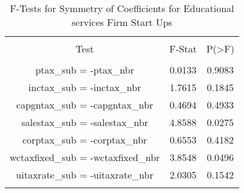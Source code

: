 
\begin{table}[!htbp] \centering 
  \caption{F-Tests for Symmetry of Coefficients for Educational services Firm Start Ups} 
  \label{61Ftests} 
\begin{tabular}{@{\extracolsep{5pt}} ccc} 
\\[-1.8ex]\hline 
\hline \\[-1.8ex] 
Test & F-Stat & P(\textgreater F) \\ 
\hline \\[-1.8ex] 
ptax\_sub = -ptax\_nbr & 0.0133 & 0.9083 \\ 
inctax\_sub = -inctax\_nbr & 1.7615 & 0.1845 \\ 
capgntax\_sub = -capgntax\_nbr & 0.4694 & 0.4933 \\ 
salestax\_sub = -salestax\_nbr & 4.8588 & 0.0275 \\ 
corptax\_sub = -corptax\_nbr & 0.6553 & 0.4182 \\ 
wctaxfixed\_sub = -wctaxfixed\_nbr & 3.8548 & 0.0496 \\ 
uitaxrate\_sub = -uitaxrate\_nbr & 2.0305 & 0.1542 \\ 
\hline \\[-1.8ex] 
\end{tabular} 
\end{table} 
